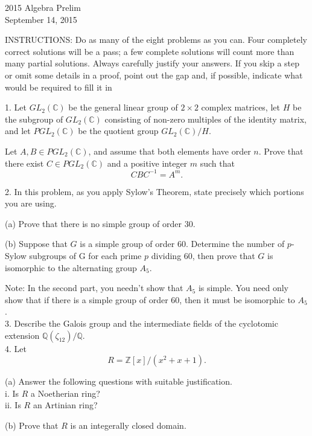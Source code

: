 \documentclass[11pt]{article}
\newcommand{\Z}{\mathbb{Z}}
\newcommand{\Q}{\mathbb{Q}}
\newcommand{\C}{\mathbb{C}}
\begin{document}
\begin{center}
\Large 2015 Algebra Prelim\\
\normalsize September 14, 2015
\end{center}
\vspace{1em}

INSTRUCTIONS: Do as many of the eight problems as you can. Four completely
correct solutions will be a pass; a few complete solutions will count more than many
partial solutions. Always carefully justify your answers. If you skip a step or omit
some details in a proof, point out the gap and, if possible, indicate what would be
required to fill it in\\
\vspace{1em}

1. Let $GL_2(\C)$ be the general linear group of $2\times 2$ complex matrices, let $H$ be the subgroup
of $GL_2(\C)$ consisting of non-zero multiples of the identity matrix, and let $PGL_2(\C)$ be
the quotient group $GL_2(\C)/ H$.

Let $A, B\in PGL_2(\C)$, and assume that both elements have order $n$. Prove that there
exist $C\in PGL_2(\C)$ and a positive integer $m$ such that\[
CBC^{-1} = A^m.\]

2. In this problem, as you apply Sylow’s Theorem, state precisely which portions you are
using.

(a) Prove that there is no simple group of order 30.

(b) Suppose that $G$ is a simple group of order $60$. Determine the number of $p$-Sylow
subgroups of G for each prime $p$ dividing 60, then prove that $G$ is isomorphic to
the alternating group $A_5$.

Note: In the second part, you needn’t show that $A_5$ is simple. You need only show
that if there is a simple group of order 60, then it must be isomorphic to $A_5$.\\

3. Describe the Galois group and the intermediate fields of the cyclotomic extension
$\Q(\zeta_{12})/\Q$.\\

4. Let \[
R = \Z[x]/(x^2+x+1).
\]

(a) Answer the following questions with suitable justification.\\
i. Is $R$ a Noetherian ring?\\
ii. Is $R$ an Artinian ring?

(b) Prove that $R$ is an integerally closed domain.\\
\end{document}
